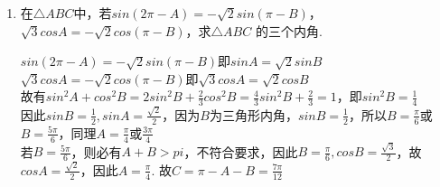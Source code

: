 \begin{enumerate}
    \begin{vspace_}
    \vsp[5]
    \end{vspace_}
        \item 在$\triangle ABC$中，若$sin(2\pi - A) = -\sqrt{2}sin(\pi - B)$，$\sqrt{3}cosA = -\sqrt{2}cos(\pi - B)$，求$\triangle ABC$ 的三个内角.
        \begin{jieda}
            $sin(2\pi - A) = -\sqrt{2}sin(\pi - B)$即$sinA =\sqrt{2}sinB$ \\
            $\sqrt{3}cosA = -\sqrt{2}cos(\pi - B)$即$\sqrt{3}cosA = \sqrt{2}cosB$ \\
            故有$sin^2A + cos^2B = 2sin^2B + \frac{2}{3}cos^2B = \frac{4}{3}sin^2B + \frac{2}{3} = 1$，即$sin^2B = \frac{1}{4}$ \\
            因此$sinB = \frac{1}{2}, sinA = \frac{\sqrt{2}}{2}$，因为$B$为三角形内角，$sinB = \frac{1}{2}$，所以$B = \frac{\pi}{6}$或$B = \frac{5\pi}{6}$，同理$A = \frac{\pi}{4}$或$\frac{3\pi}{4}$ \\
            若$B = \frac{5\pi}{6}$，则必有$A+B > pi$，不符合要求，因此$B = \frac{\pi}{6}, cosB = \frac{\sqrt{3}}{2}$，故$cosA = \frac{\sqrt{2}}{2}$，因此$A = \frac{\pi}{4}$. 故$C = \pi - A - B = \frac{7\pi}{12}$
        \end{jieda}
    \begin{vspace_}
    \vsp[5]
    \end{vspace_}
\end{enumerate}